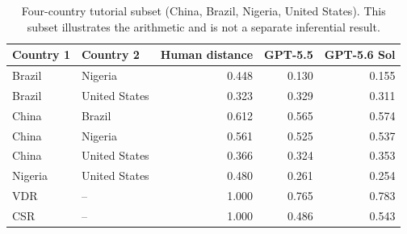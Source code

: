 \begin{table}[!htbp]
\centering
\caption{Four-country tutorial subset (China, Brazil, Nigeria, United States). This subset illustrates the arithmetic and is not a separate inferential result.}
\label{tab:tutorial-geometry}
\small
\begin{tabular}{llrrr}
\toprule
\rowcolor{tablehead} Country 1 & Country 2 & Human distance & GPT-5.5 & GPT-5.6 Sol \\
\midrule
Brazil & Nigeria & 0.448 & 0.130 & 0.155 \\
Brazil & United States & 0.323 & 0.329 & 0.311 \\
China & Brazil & 0.612 & 0.565 & 0.574 \\
China & Nigeria & 0.561 & 0.525 & 0.537 \\
China & United States & 0.366 & 0.324 & 0.353 \\
Nigeria & United States & 0.480 & 0.261 & 0.254 \\
\midrule
VDR & -- & 1.000 & 0.765 & 0.783 \\
CSR & -- & 1.000 & 0.486 & 0.543 \\
\bottomrule
\end{tabular}
\end{table}
